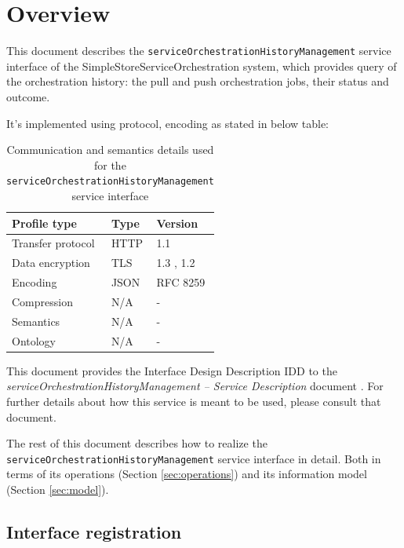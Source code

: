 \documentclass[a4paper]{arrowhead}
\begin{document}
\section{Overview}
\label{sec:overview}

This document describes the \texttt{service\allowbreak{}Orchestration\allowbreak{}History\allowbreak{}Management} service interface of the SimpleStoreServiceOrchestration system, which provides query of the orchestration history: the pull and push orchestration jobs, their status and outcome.

It's implemented using protocol, encoding as stated in below table:
\begin{table}[ht!]
  \centering
  \begin{tabular}{|l|l|l|}
    \hline
    \rowcolor{gray!33} Profile type & Type & Version \\ \hline
    Transfer protocol & HTTP & 1.1 \cite{rfc9112} \\ \hline
    Data encryption & TLS & 1.3 \cite{rfc8446}, 1.2 \cite{rfc5246} \\ \hline
    Encoding & JSON & RFC 8259 \cite{rfc8259} \\ \hline
    Compression & N/A & - \\ \hline
    Semantics & N/A & - \\ \hline
    Ontology & N/A & - \\ \hline
  \end{tabular}
  \caption{Communication and semantics details used for the \texttt{service\allowbreak{}Orchestration\allowbreak{}History\allowbreak{}Management} service interface}
  \label{tab:comunication_semantics_profile}
\end{table}

This document provides the Interface Design Description IDD to the \textit{serviceOrchestrationHistoryManagement -- Service Description} document \cite{ssso-serviceOrchestrationHistoryManagement-sd}.
For further details about how this service is meant to be used, please consult that document.

The rest of this document describes how to realize the \texttt{service\allowbreak{}Orchestration\allowbreak{}History\allowbreak{}Management} service
interface in detail. Both in terms of its operations (Section \ref{sec:operations}) and its information model (Section \ref{sec:model}).

\subsection{Interface registration}
\end{document}
